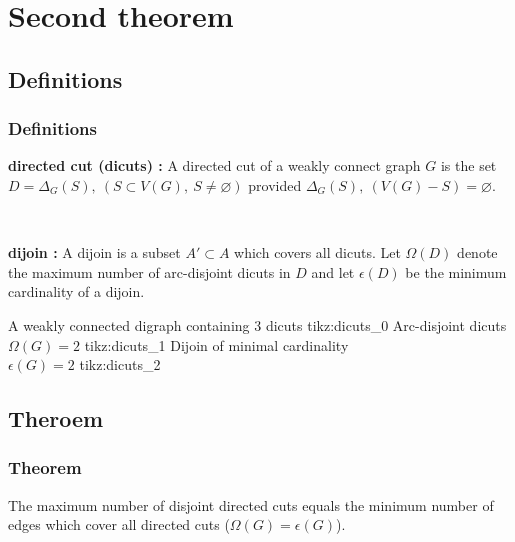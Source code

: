 \documentclass[8pt]{beamer}
\begin{document}
\section{Second theorem}
\subsection{Definitions}
\begin{frame}
\frametitle{Definitions}

\textbf{directed cut (dicuts) :}
A directed cut of a weakly connect graph $G$ is the set $D = \Delta_G(S),\ (S \subset V(G),\ S \neq \varnothing)$ provided $\Delta_G(S),\ (V(G) - S) = \varnothing$.

~
    
\textbf{dijoin :} A dijoin is a subset $A' \subset A$ which covers all dicuts. Let $\Omega(D)$ denote the maximum number of arc-disjoint dicuts in $D$ 
and let $\epsilon(D)$ be the minimum cardinality of a dijoin.

\threesplitpage
{
    {A weakly connected digraph containing 3 dicuts}
    {tikz:dicuts_0}
}{
    {Arc-disjoint dicuts\\$\Omega(G) = 2$}
    {tikz:dicuts_1}
}{
    {Dijoin of minimal cardinality\\$\epsilon(G) = 2$}
    {tikz:dicuts_2}
}

\end{frame}

\subsection{Theroem}
\begin{frame}
\frametitle{Theorem}
    
\begin{Lucchesi_and_Younger}
The maximum number of disjoint directed cuts equals the minimum number of edges which cover all directed cuts ($\Omega(G) = \epsilon(G)$).
\end{Lucchesi_and_Younger}

\end{frame}
\end{document}
